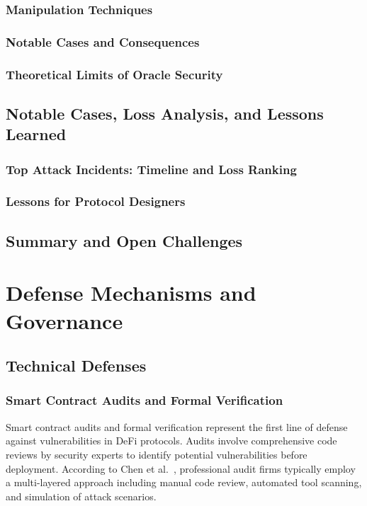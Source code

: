 \documentclass[conference]{IEEEtran}
\begin{document}
    \subsubsection{Manipulation Techniques}
    \subsubsection{Notable Cases and Consequences}
    \subsubsection{Theoretical Limits of Oracle Security}
\subsection{Notable Cases, Loss Analysis, and Lessons Learned}
    \subsubsection{Top Attack Incidents: Timeline and Loss Ranking}
    \subsubsection{Lessons for Protocol Designers}
\subsection{Summary and Open Challenges}

\section{Defense Mechanisms and Governance}
\subsection{Technical Defenses}
    \subsubsection{Smart Contract Audits and Formal Verification}
    Smart contract audits and formal verification represent the first line of defense against vulnerabilities in DeFi protocols. Audits involve comprehensive code reviews by security experts to identify potential vulnerabilities before deployment. According to Chen et al.~\cite{chen2022defining}, professional audit firms typically employ a multi-layered approach including manual code review, automated tool scanning, and simulation of attack scenarios.
\end{document}
